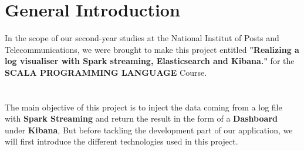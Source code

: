 \chapter*{General Introduction}
\begin{spacing}{1.5}

\Large In the scope of our second-year studies at the National Institut of Posts and Telecommunications, we were brought to make this project entitled \textbf{"Realizing a log visualiser with Spark streaming, Elasticsearch and Kibana."} for the \textbf{SCALA PROGRAMMING LANGUAGE} Course.\\

\\\\

The main objective of this project is to inject the data coming from a log file with \textbf{Spark Streaming} and return the result in the form of a \textbf{Dashboard} under \textbf{Kibana}, But before tackling the development part of our application, we will first introduce the different technologies used in this project.


\end{spacing}

\makeatletter
\renewcommand{\thesection}{\@arabic\c@section}
\makeatother
